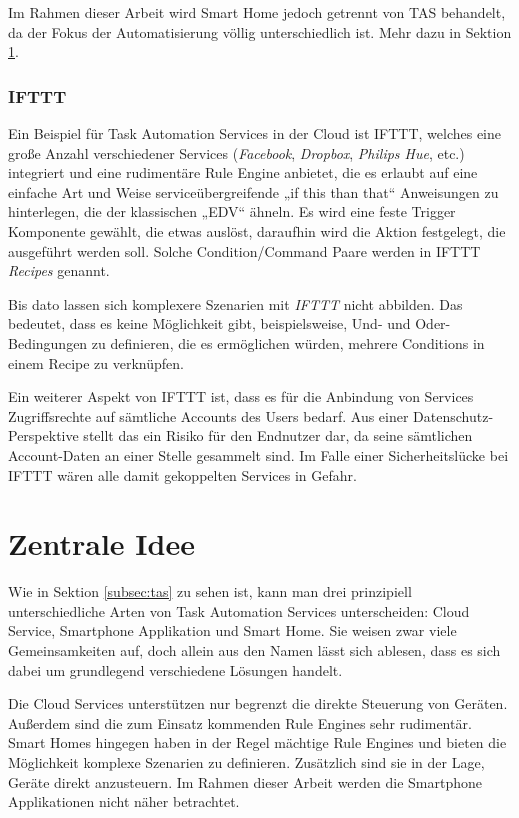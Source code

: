 Im Rahmen dieser Arbeit wird Smart Home jedoch getrennt von TAS behandelt, da der Fokus der Automatisierung völlig unterschiedlich ist. Mehr dazu in Sektion \ref{sec:idee}.



\subsubsection{IFTTT}
Ein Beispiel für Task Automation Services in der Cloud ist IFTTT, welches eine große Anzahl verschiedener Services (\textit{Facebook}, \textit{Dropbox}, \textit{Philips Hue},   etc.) integriert und eine rudimentäre Rule Engine anbietet, die es erlaubt auf eine einfache Art und Weise serviceübergreifende „if this than that“ Anweisungen zu hinterlegen, die der klassischen „EDV“ ähneln. Es wird eine feste Trigger Komponente gewählt, die etwas auslöst, daraufhin wird die Aktion festgelegt, die ausgeführt werden soll. Solche Condition/Command Paare werden in IFTTT \textit{Recipes} genannt. 

Bis dato lassen sich komplexere Szenarien mit \textit{IFTTT} nicht abbilden.  Das bedeutet, dass es keine Möglichkeit gibt, beispielsweise, Und- und Oder-Bedingungen zu definieren, die es ermöglichen würden, mehrere Conditions in einem Recipe zu verknüpfen.

Ein weiterer Aspekt von IFTTT ist, dass es für die Anbindung von Services Zugriffsrechte auf sämtliche Accounts des Users bedarf. Aus einer Datenschutz-Perspektive\cite{cloudsec} stellt das ein Risiko für den Endnutzer dar, da seine sämtlichen Account-Daten an einer Stelle gesammelt sind. Im Falle einer Sicherheitslücke bei IFTTT wären alle damit gekoppelten Services in Gefahr. 

\section{Zentrale Idee}
\label{sec:idee}
Wie in Sektion \ref{subsec:tas} zu sehen ist, kann man drei prinzipiell unterschiedliche Arten von Task Automation Services unterscheiden: Cloud Service, Smartphone Applikation und Smart Home. Sie weisen zwar viele Gemeinsamkeiten auf, doch allein aus den Namen lässt sich ablesen, dass es sich dabei um grundlegend verschiedene Lösungen handelt. 

Die Cloud Services unterstützen nur begrenzt die \glqq direkte\grqq{}  Steuerung von Geräten. Außerdem sind die zum Einsatz kommenden Rule Engines sehr rudimentär. Smart Homes hingegen haben in der Regel mächtige Rule Engines und bieten die Möglichkeit komplexe Szenarien zu definieren. Zusätzlich sind sie in der Lage, Geräte direkt anzusteuern. Im Rahmen dieser Arbeit werden die Smartphone Applikationen nicht näher betrachtet.\\

